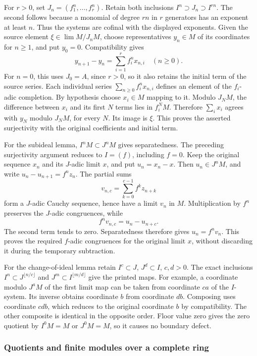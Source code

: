 For \(r>0\), set \(J_n=(f_1^n,\ldots,f_r^n)\). Retain both inclusions \(I^n\supset J_n\supset I^{rn}\). The second follows because a monomial of degree \(rn\) in \(r\) generators has an exponent at least \(n\). Thus the systems are cofinal with the displayed exponents. Given the source element \(\xi\in\lim M/J_nM\), choose representatives \(y_n\in M\) of its coordinates for \(n\geq1\), and put \(y_0=0\). Compatibility gives \[
y_{n+1}-y_n=\sum_{i=1}^r f_i^n x_{n,i}\quad(n\geq0).
\] For \(n=0\), this uses \(J_0=A\), since \(r>0\), so it also retains the initial term of the source series. Each individual series \(\sum_{n\geq0}f_i^nx_{n,i}\) defines an element of the \(f_i\)-adic completion. By hypothesis choose \(x_i\in M\) mapping to it. Modulo \(J_NM\), the difference between \(x_i\) and its first \(N\) terms lies in \(f_i^NM\). Therefore \(\sum_i x_i\) agrees with \(y_N\) modulo \(J_NM\), for every \(N\). Its image is \(\xi\). This proves the asserted surjectivity with the original coefficients and initial term.

For the subideal lemma, \(I^nM\subset J^nM\) gives separatedness. The preceding surjectivity argument reduces to \(I=(f)\), including \(f=0\). Keep the original sequence \(x_n\) and its \(J\)-adic limit \(x\), and put \(u_n=x_n-x\). Then \(u_n\in J^nM\), and write \(u_n-u_{n+1}=f^nz_n\). The partial sums \[
v_{n,c}=\sum_{k=0}^{c-1}f^kz_{n+k}
\] form a \(J\)-adic Cauchy sequence, hence have a limit \(v_n\) in \(M\). Multiplication by \(f^n\) preserves the \(J\)-adic congruences, while \[
f^nv_{n,c}=u_n-u_{n+c}.
\] The second term tends to zero. Separatedness therefore gives \(u_n=f^nv_n\). This proves the required \(f\)-adic congruences for the original limit \(x\), without discarding it during the temporary subtraction.

For the change-of-ideal lemma retain \(I^c\subset J\), \(J^d\subset I\), \(c,d>0\). The exact inclusions \(I^n\subset J^{\lfloor n/c\rfloor}\) and \(J^m\subset I^{\lfloor m/d\rfloor}\) give the printed maps. For example, a coordinate modulo \(J^aM\) of the first limit map can be taken from coordinate \(ca\) of the \(I\)-system. Its inverse obtains coordinate \(b\) from coordinate \(db\). Composing uses coordinate \(cdb\), which reduces to the original coordinate \(b\) by compatibility. The other composite is identical in the opposite order. Floor value zero gives the zero quotient by \(I^0M=M\) or \(J^0M=M\), so it causes no boundary defect.

\subsubsection{Quotients and finite modules over a complete ring}\label{algebra-proof-014-quotients-and-finite-modules-over-a-complete-ring}

